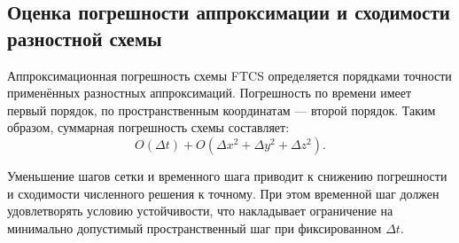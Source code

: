 \subsection{Оценка погрешности аппроксимации и сходимости разностной схемы}

Аппроксимационная погрешность схемы FTCS определяется порядками 
точности применённых разностных аппроксимаций. Погрешность по времени 
имеет первый порядок, по пространственным координатам --- 
второй порядок. Таким образом, 
суммарная погрешность схемы составляет:
\begin{equation}
    O(\Delta t) + O(\Delta x^2 + \Delta y^2 + \Delta z^2).
\end{equation}

Уменьшение шагов сетки и временного шага приводит к снижению 
погрешности и сходимости численного решения к точному. При этом 
временной шаг  должен удовлетворять условию устойчивости, 
что накладывает ограничение на минимально допустимый пространственный 
шаг при фиксированном $\Delta t$.

